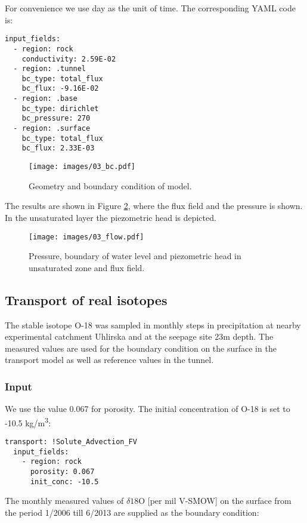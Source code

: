 For convenience we use day as the unit of time. The corresponding YAML
code is:

\begin{verbatim}
input_fields:
  - region: rock
    conductivity: 2.59E-02
  - region: .tunnel
    bc_type: total_flux
    bc_flux: -9.16E-02
  - region: .base
    bc_type: dirichlet
    bc_pressure: 270
  - region: .surface
    bc_type: total_flux
    bc_flux: 2.33E-03
\end{verbatim}

\begin{figure}[htbp]
\centering
\texttt{[image: images/03\_bc.pdf]}
\caption{Geometry and boundary condition of model.\label{fig:geom}}
\end{figure}

The results are shown in Figure \ref{fig:flow}, where the flux field and
the pressure is shown. In the unsaturated layer the piezometric head is
depicted.

\begin{figure}[htbp]
\centering
\texttt{[image: images/03\_flow.pdf]}
\caption{Pressure, boundary of water level and piezometric head in
unsaturated zone and flux field.\label{fig:flow}}
\end{figure}

\subsection{Transport of real
isotopes}\label{transport-of-real-isotopes}

The stable isotope O-18 was sampled in monthly steps in precipitation at
nearby experimental catchment Uhlirska and at the seepage site 23m
depth. The measured values are used for the boundary condition on the
surface in the transport model as well as reference values in the
tunnel.

\subsubsection{Input}\label{input}

We use the value 0.067 for porosity. The initial concentration of O-18
is set to -10.5 kg/m\textsuperscript{3}:

\begin{verbatim}
transport: !Solute_Advection_FV
  input_fields:
    - region: rock
      porosity: 0.067
      init_conc: -10.5
\end{verbatim}

The monthly measured values of \(\delta18\text{O}\) {[}per mil V-SMOW{]}
on the surface from the period 1/2006 till 6/2013 are supplied as the
boundary condition:

